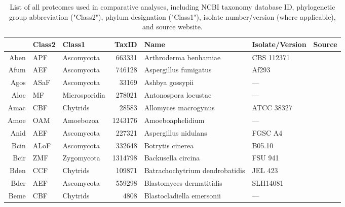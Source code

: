 
\centering
{\renewcommand{\arraystretch}{0.5}
{\footnotesize
{\setlength{\tabcolsep}{1pt}
\begin{longtable}{rllrlll}
\caption[List of proteomes used in comparative analyses.]{List of all proteomes used in comparative analyses, including NCBI taxonomy database ID, phylogenetic group abbreviation ("Class2"), phylum designation ("Class1"), isolate number/version (where applicable), and source website.} \label{tab:AppData_taxa} \\
  \hline
\hline
 & Class2 & Class1 & TaxID & Name & Isolate/Version & Source \\ 
  \hline
Aben & APF & Ascomycota & 663331 & Arthroderma benhamiae & CBS 112371 & \cite{Aben} \\ 
  Afum & AEF & Ascomycota & 746128 & Aspergillus fumigatus & Af293 & \cite{Afum} \\ 
  Agos & ASaF & Ascomycota & 33169 & Ashbya gossypii & --- & \cite{Agos} \\ 
  Aloc & MF & Microsporidia & 278021 & Antonospora locustae & --- & \cite{Aloc} \\ 
  Amac & CBF & Chytrids & 28583 & Allomyces macrogynus & ATCC 38327 & \cite{Amac} \\ 
  Amoe & OAM & Amoebozoa & 1243176 & Amoeboaphelidium & --- & \cite{Amoe} \\ 
  Anid & AEF & Ascomycota & 227321 & Aspergillus nidulans & FGSC A4 & \cite{Anid} \\ 
  Bcin & ALoF & Ascomycota & 332648 & Botrytis cinerea & B05.10 & \cite{Bcin} \\ 
  Bcir & ZMF & Zygomycota & 1314798 & Backusella circina & FSU 941 & \cite{Bcir} \\ 
  Bden & CCF & Chytrids & 109871 & Batrachochytrium dendrobatidis & JEL 423 & \cite{Bden} \\ 
  Bder & AEF & Ascomycota & 559298 & Blastomyces dermatitidis & SLH14081 & \cite{Bder} \\ 
  Beme & CBF & Chytrids & 4808 & Blastocladiella emersonii & --- & \cite{Beme} \\ 

\end{longtable}}}}

